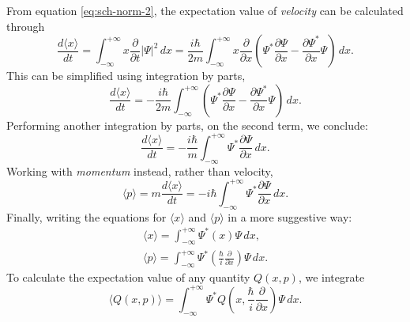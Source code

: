 \documentclass{article}
\begin{document}
From equation \eqref{eq:sch-norm-2}, the expectation value of \emph{velocity}
can be calculated through
\begin{equation} \label{eq:sch-mom-1}
  \frac{d\langle x \rangle}{dt}
  = \int_{-\infty}^{+\infty} x \frac{\partial}{\partial t} |\Psi|^2 \,dx
  = \frac{i\hbar}{2m} \int_{-\infty}^{+\infty} x \frac{\partial}{\partial x}
  \left(
    \Psi^* \frac{\partial \Psi}{\partial x} -
    \frac{\partial \Psi^*}{\partial x} \Psi
  \right) \,dx.
\end{equation}
This can be simplified using integration by parts,
\begin{equation} \label{eq:sch-mom-2}
  \frac{d\langle x \rangle}{dt}
  = -\frac{i\hbar}{2m} \int_{-\infty}^{+\infty} \left(
    \Psi^* \frac{\partial \Psi}{\partial x} -
    \frac{\partial \Psi^*}{\partial x} \Psi
  \right) \,dx.
\end{equation}
Performing another integration by parts, on the second term, we conclude:
\begin{equation} \label{eq:sch-mom-3}
  \frac{d\langle x \rangle}{dt}
  = -\frac{i\hbar}{m} \int_{-\infty}^{+\infty} \Psi^*
  \frac{\partial \Psi}{\partial x} \,dx.
\end{equation}
Working with \emph{momentum} instead, rather than velocity,
\begin{equation} \label{eq:sch-mom-4}
  \langle p \rangle
  = m \frac{d \langle x \rangle}{dt}
  = -i\hbar \int_{-\infty}^{+\infty} \Psi^*
  \frac{\partial \Psi}{\partial x} \,dx.
\end{equation}
Finally, writing the equations for $\langle x \rangle$ and $\langle p \rangle$
in a more suggestive way:
\begin{gather}
  \label{eq:sch-vel}
  \langle x \rangle = \int_{-\infty}^{+\infty} \Psi^* (x) \Psi \,dx, \\
  \label{eq:sch-mom}
  \langle p \rangle = \int_{-\infty}^{+\infty} \Psi^* \left(
    \frac{\hbar}{i} \frac{\partial}{\partial x}
  \right)\Psi \,dx.
\end{gather}
To calculate the expectation value of any quantity $Q(x, p)$, we integrate
\begin{equation} \label{eq:sch-qty}
  \langle Q(x, p) \rangle = \int_{-\infty}^{+\infty} \Psi^* Q\left(
    x,
    \frac{\hbar}{i}\frac{\partial}{\partial x}
  \right) \Psi \,dx.
\end{equation}
\end{document}
